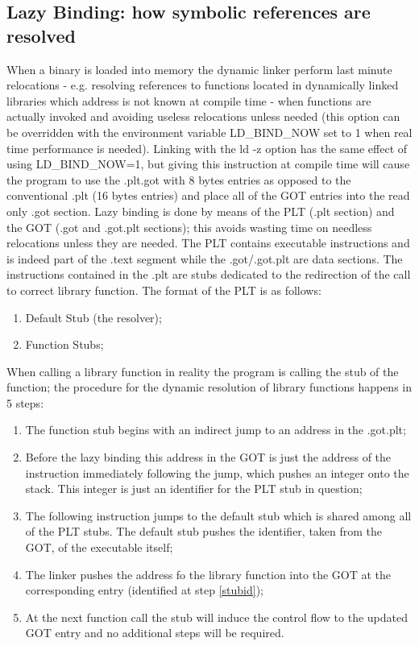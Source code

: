 \subsection{Lazy Binding: how symbolic references are resolved}
When a binary is loaded into memory the dynamic linker perform last minute relocations - e.g. resolving references to
functions located in dynamically linked libraries which address is not known at compile time - when functions are
actually invoked and avoiding useless relocations unless needed (this option can be overridden with the environment
variable {\ttfamily LD\_BIND\_NOW} set to 1 when real time performance is needed).
Linking with the {\ttfamily ld -z} option has the same effect of using {\ttfamily LD\_BIND\_NOW=1}, but giving this
instruction at compile time will cause the program to use the {\ttfamily .plt.got} with 8 bytes entries as opposed to
the conventional {\ttfamily .plt} (16 bytes entries) and place all of the GOT entries into the read only {\ttfamily
.got} section.
Lazy binding is done by means of the PLT ({\ttfamily .plt} section) and the GOT ({\ttfamily .got} and {\ttfamily
.got.plt} sections); this avoids wasting time on needless relocations unless they are needed. The PLT contains executable
instructions and is indeed part of the {\ttfamily .text} segment while the {\ttfamily .got}/{\ttfamily .got.plt} are
data sections. The instructions contained in the {\ttfamily .plt} are stubs dedicated to the redirection of the call to
correct library function. The format of the PLT is as follows:
\begin{enumerate}
    \item Default Stub (the resolver);
    \item Function Stubs;
\end{enumerate}
When calling a library function in reality the program is calling the stub of the function; the procedure for the
dynamic resolution of library functions happens in 5 steps:
\begin{enumerate}
    \item The function stub begins with an indirect jump to an address in the {\ttfamily .got.plt};
    \item \label{stubid} Before the lazy binding this address in the GOT is just the address of the instruction
        immediately  following the jump, which pushes an integer onto the stack. This integer is just an identifier for
        the PLT stub in question;
    \item The following instruction jumps to the default stub which is shared among all of the PLT stubs. The default
        stub pushes the identifier, taken from the GOT, of the executable itself;
    \item The linker pushes the address fo the library function into the GOT at the corresponding entry (identified at
        step \ref{stubid});
    \item At the next function call the stub will induce the control flow to the updated GOT entry and no additional
        steps will be required.
\end{enumerate}
